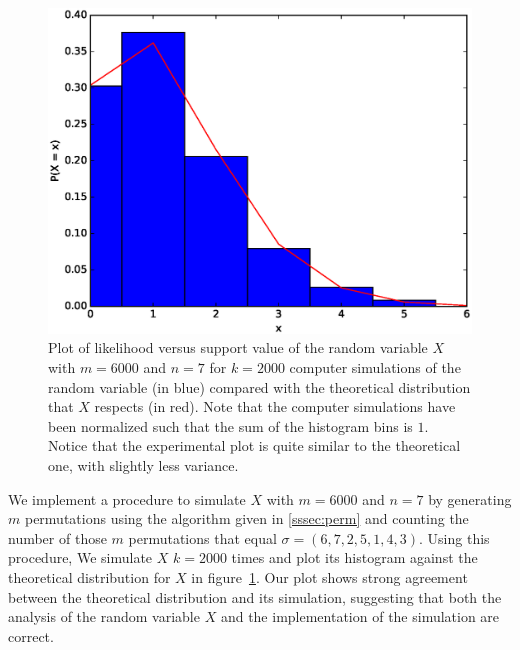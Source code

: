\documentclass[11pt, oneside]{article}   	%
\begin{document}
\begin{figure}[H]
\includegraphics[scale=.5]{part_1_problem_4}
\caption{Plot of likelihood versus support value of the random variable $X$ with $m = 6000$ and $n = 7$ for $k = 2000$ computer simulations of the random variable (in blue) compared with the theoretical distribution that $X$ respects (in red). Note that the computer simulations have been normalized such that the sum of the histogram bins is $1$. Notice that the experimental plot is quite similar to the theoretical one, with slightly less variance.}
\label{fig:x}
\end{figure}

We implement a procedure to simulate $X$ with $m = 6000$ and $n = 7$ by generating $m$ permutations using the algorithm given in \ref{sssec:perm} and counting the number of those $m$ permutations that equal $\sigma = (6, 7, 2, 5, 1, 4, 3)$. Using this procedure, We simulate $X$ $k = 2000$ times and plot its histogram against the theoretical distribution for $X$ in figure~\ref{fig:x}. Our plot shows strong agreement between the theoretical distribution and its simulation, suggesting that both the analysis of the random variable $X$ and the implementation of the simulation are correct.
\end{document}
